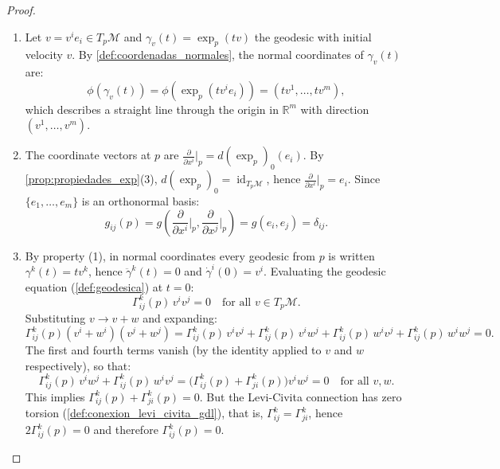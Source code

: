\begin{proof}
\leavevmode
\begin{enumerate}
	\item Let $v = v^i e_i \in T_p\mathcal{M}$ and $\gamma_v(t) = \exp_p(tv)$ the geodesic with initial velocity $v$. By \autoref{def:coordenadas_normales}, the normal coordinates of $\gamma_v(t)$ are:
	\[
	\phi(\gamma_v(t)) = \phi(\exp_p(t v^i e_i)) = (tv^1, \ldots, tv^m),
	\]
	which describes a straight line through the origin in $\mathbb{R}^m$ with direction $(v^1, \ldots, v^m)$.

	\item The coordinate vectors at $p$ are $\frac{\partial}{\partial x^i}\big|_p = d(\exp_p)_0(e_i)$. By \autoref{prop:propiedades_exp}(3), $d(\exp_p)_0 = \operatorname{id}_{T_p\mathcal{M}}$, hence $\frac{\partial}{\partial x^i}\big|_p = e_i$. Since $\{e_1, \ldots, e_m\}$ is an orthonormal basis:
	\[
	g_{ij}(p) = g\!\left(\frac{\partial}{\partial x^i}\bigg|_p, \frac{\partial}{\partial x^j}\bigg|_p\right) = g(e_i, e_j) = \delta_{ij}.
	\]

	\item By property (1), in normal coordinates every geodesic from $p$ is written $\gamma^k(t) = tv^k$, hence $\ddot{\gamma}^k(t) = 0$ and $\dot{\gamma}^i(0) = v^i$. Evaluating the geodesic equation (\autoref{def:geodesica}) at $t = 0$:
	\[
	\Gamma^k_{ij}(p)\, v^i v^j = 0 \quad \text{for all } v \in T_p\mathcal{M}.
	\]
	Substituting $v \to v + w$ and expanding:
	\[
	\Gamma^k_{ij}(p)(v^i + w^i)(v^j + w^j) = \Gamma^k_{ij}(p)\,v^iv^j + \Gamma^k_{ij}(p)\,v^iw^j + \Gamma^k_{ij}(p)\,w^iv^j + \Gamma^k_{ij}(p)\,w^iw^j = 0.
	\]
	The first and fourth terms vanish (by the identity applied to $v$ and $w$ respectively), so that:
	\[
	\Gamma^k_{ij}(p)\,v^iw^j + \Gamma^k_{ij}(p)\,w^iv^j = \bigl(\Gamma^k_{ij}(p) + \Gamma^k_{ji}(p)\bigr)v^i w^j = 0 \quad \text{for all } v, w.
	\]
	This implies $\Gamma^k_{ij}(p) + \Gamma^k_{ji}(p) = 0$. But the Levi-Civita connection has zero torsion (\autoref{def:conexion_levi_civita_gdl}), that is, $\Gamma^k_{ij} = \Gamma^k_{ji}$, hence $2\Gamma^k_{ij}(p) = 0$ and therefore $\Gamma^k_{ij}(p) = 0$.


\end{enumerate}
\end{proof}
